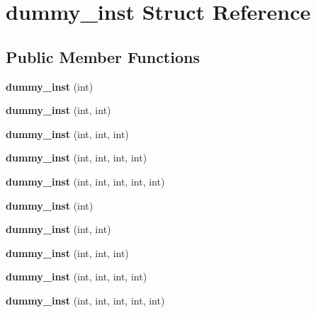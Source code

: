 \hypertarget{structdummy__inst}{}\section{dummy\+\_\+inst Struct Reference}
\label{structdummy__inst}
\subsection*{Public Member Functions}
\begin{DoxyCompactItemize}
\item 
\mbox{\label{structdummy__inst_abf4b93891b3525e03d0150821d67153e}} 
{\bfseries dummy\+\_\+inst} (int)
\item 
\mbox{\label{structdummy__inst_a4baf2ed964aff01669733e52177aad82}} 
{\bfseries dummy\+\_\+inst} (int, int)
\item 
\mbox{\label{structdummy__inst_ac77c5223e8cd1acafc8ff5bb08a0d7cd}} 
{\bfseries dummy\+\_\+inst} (int, int, int)
\item 
\mbox{\label{structdummy__inst_ab7a46c43fbbcbee84d2182bbd1ebfe5b}} 
{\bfseries dummy\+\_\+inst} (int, int, int, int)
\item 
\mbox{\label{structdummy__inst_a3150cf54d230a62fed4ebcc99778ab85}} 
{\bfseries dummy\+\_\+inst} (int, int, int, int, int)
\item 
\mbox{\label{structdummy__inst_abf4b93891b3525e03d0150821d67153e}} 
{\bfseries dummy\+\_\+inst} (int)
\item 
\mbox{\label{structdummy__inst_a4baf2ed964aff01669733e52177aad82}} 
{\bfseries dummy\+\_\+inst} (int, int)
\item 
\mbox{\label{structdummy__inst_ac77c5223e8cd1acafc8ff5bb08a0d7cd}} 
{\bfseries dummy\+\_\+inst} (int, int, int)
\item 
\mbox{\label{structdummy__inst_ab7a46c43fbbcbee84d2182bbd1ebfe5b}} 
{\bfseries dummy\+\_\+inst} (int, int, int, int)
\item 
\mbox{\label{structdummy__inst_a3150cf54d230a62fed4ebcc99778ab85}} 
{\bfseries dummy\+\_\+inst} (int, int, int, int, int)
\end{DoxyCompactItemize}
